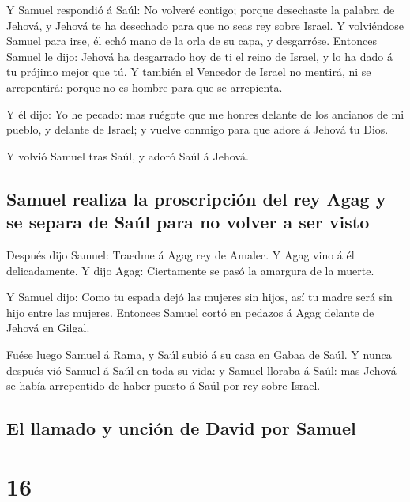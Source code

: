  Y Samuel respondió á Saúl: No volveré contigo; porque
desechaste la palabra de Jehová, y Jehová te ha desechado para que no
seas rey sobre Israel.  Y volviéndose Samuel para irse, él
echó mano de la orla de su capa, y desgarróse.  Entonces
Samuel le dijo: Jehová ha desgarrado hoy de ti el reino de Israel, y lo
ha dado á tu prójimo mejor que tú.  Y también el Vencedor
de Israel no mentirá, ni se arrepentirá: porque no es hombre para que se
arrepienta.

 Y él dijo: Yo he pecado: mas ruégote que me honres delante
de los ancianos de mi pueblo, y delante de Israel; y vuelve conmigo para
que adore á Jehová tu Dios.

 Y volvió Samuel tras Saúl, y adoró Saúl á Jehová.

\hypertarget{samuel-realiza-la-proscripciuxf3n-del-rey-agag-y-se-separa-de-sauxfal-para-no-volver-a-ser-visto}{%
\subsection{Samuel realiza la proscripción del rey Agag y se separa de
Saúl para no volver a ser
visto}\label{samuel-realiza-la-proscripciuxf3n-del-rey-agag-y-se-separa-de-sauxfal-para-no-volver-a-ser-visto}}

 Después dijo Samuel: Traedme á Agag rey de Amalec. Y Agag
vino á él delicadamente. Y dijo Agag: Ciertamente se pasó la amargura de
la muerte.

 Y Samuel dijo: Como tu espada dejó las mujeres sin hijos,
así tu madre será sin hijo entre las mujeres. Entonces Samuel cortó en
pedazos á Agag delante de Jehová en Gilgal.

 Fuése luego Samuel á Rama, y Saúl subió á su casa en Gabaa
de Saúl.  Y nunca después vió Samuel á Saúl en toda su
vida: y Samuel lloraba á Saúl: mas Jehová se había arrepentido de haber
puesto á Saúl por rey sobre Israel.

\hypertarget{el-llamado-y-unciuxf3n-de-david-por-samuel}{%
\subsection{El llamado y unción de David por
Samuel}\label{el-llamado-y-unciuxf3n-de-david-por-samuel}}

\hypertarget{section-15}{%
\section{16}\label{section-15}}

